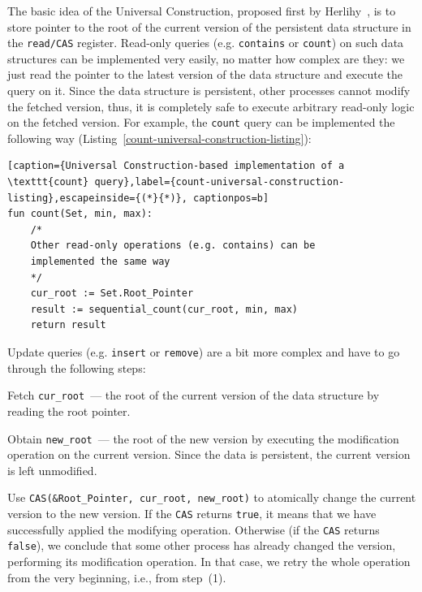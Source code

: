 \documentclass[times, dvipsnames,%
               languages={russian,english} %
              ]{itmo-student-thesis}
\begin{document}
The basic idea of the Universal Construction, proposed first by Herlihy~\cite{herlihy1991wait}, is to store pointer to the root of the current version of the persistent data structure in the \texttt{read/CAS} register. Read-only queries (e.g. \texttt{contains} or \texttt{count}) on such data structures can be implemented very easily, no matter how complex are they: we just read the pointer to the latest version of the data structure and execute the query on it. Since the data structure is persistent, other processes cannot modify the fetched version, thus, it is completely safe to execute arbitrary read-only logic on the fetched version. For example, the \texttt{count} query can be implemented the following way (Listing~\ref{count-universal-construction-listing}):

\renewcommand{\lstlistingname}{Listing}
\begin{lstlisting}[caption={Universal Construction-based implementation of a \texttt{count} query},label={count-universal-construction-listing},escapeinside={(*}{*)}, captionpos=b]
fun count(Set, min, max):
    /*
    Other read-only operations (e.g. contains) can be 
    implemented the same way
    */
    cur_root := Set.Root_Pointer
    result := sequential_count(cur_root, min, max)
    return result
\end{lstlisting}

Update queries (e.g. \texttt{insert} or \texttt{remove}) are a bit more complex and have to go through the following steps:

\begin{nenum}
    \item Fetch \texttt{cur\_root}~--- the root of the current version of the data structure by reading the root pointer.
    
    \item Obtain \texttt{new\_root}~--- the root of the new version by executing the modification operation on the current version. Since the data is persistent, the current version is left unmodified.
    
    \item Use \texttt{CAS(\&Root\_Pointer, cur\_root, new\_root)} to atomically change the current version to the new version. If the \texttt{CAS} returns \texttt{true}, it means that we have successfully applied the modifying operation. Otherwise (if the \texttt{CAS} returns \texttt{false}), we conclude that some other process has already changed the version, performing its modification operation. In that case, we retry the whole operation from the very beginning, i.e., from step~(1).
\end{nenum}
\end{document}
